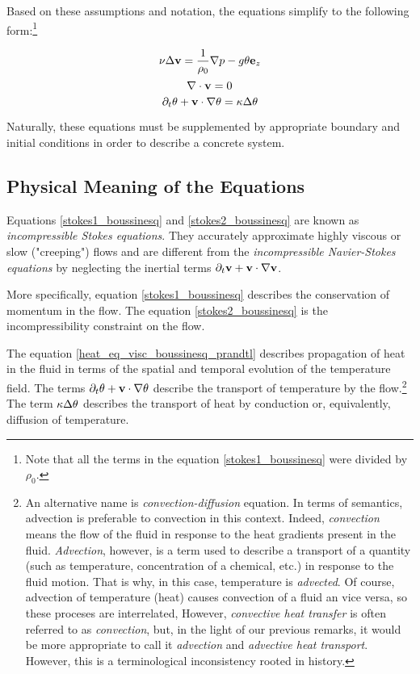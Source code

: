 Based on these assumptions and notation, the equations simplify to the following form:\footnote{Note that all the terms in the equation \ref{stokes1_boussinesq} were divided by $\rho_0$.}

\begin{equation} \label{stokes1_boussinesq}
\nu \Delta\mathbf{v} = \frac{1}{\rho_0}\nabla p - g \theta \mathbf{e}_z
\end{equation}
\begin{equation} \label{stokes2_boussinesq}
\nabla\cdot \mathbf{v} = 0
\end{equation}
\begin{equation} \label{heat_eq_visc_boussinesq_prandtl}
\partial_t\theta + \mathbf{v}\cdot\nabla\theta = \kappa \Delta\theta  
\end{equation} 

Naturally, these equations must be supplemented by appropriate boundary and initial conditions in order to describe a concrete system.

\subsection{Physical Meaning of the Equations}

Equations \ref{stokes1_boussinesq} and \ref{stokes2_boussinesq} are known as \emph{incompressible Stokes equations}. They accurately approximate highly viscous or slow ("creeping") flows and are different from the \emph{incompressible Navier-Stokes equations} by neglecting the inertial terms $\partial_t\mathbf{v} + \mathbf{v}\cdot\nabla \mathbf{v}$.

More specifically, equation \ref{stokes1_boussinesq} describes the conservation of momentum in the flow. The equation \ref{stokes2_boussinesq} is the incompressibility constraint on the flow.

The equation \ref{heat_eq_visc_boussinesq_prandtl} describes propagation of heat in the fluid in terms of the spatial and temporal evolution of the temperature field. The terms $\partial_t\theta + \mathbf{v}\cdot\nabla\theta$ describe the transport of temperature by the flow.\footnote{An alternative name is \emph{convection-diffusion} equation. In terms of semantics, advection is preferable to convection in this context. Indeed, \emph{convection} means the flow of the fluid in response to the heat gradients present in the fluid. \emph{Advection}, however, is a term used to describe a transport of a quantity (such as temperature, concentration of a chemical, etc.) in response to the fluid motion. That is why, in this case, temperature is \emph{advected}. Of course, advection of temperature (heat) causes convection of a fluid an vice versa, so these proceses are interrelated, However, \emph{convective heat transfer} is often referred to as \emph{convection}, but, in the light of our previous remarks, it would be more appropriate to call it \emph{advection} and \emph{advective heat transport}. However, this is a terminological inconsistency rooted in history.} The term $\kappa \Delta\theta$ describes the transport of heat by conduction or, equivalently, diffusion of temperature.

